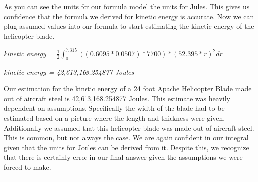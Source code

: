 \documentclass[a4paper, 11pt, oneside]{book} %
\begin{document}
As you can see the units for our formula model the units for Jules. This gives us confidence that the formula we derived for kinetic energy is accurate. Now we can plug assumed values into our formula to start estimating the kinetic energy of the helicopter blade.\\

\vspace{0.5\baselineskip} %
\vspace{0.5\baselineskip} %

\textit{kinetic energy = $\frac{1}{2} \int_{0}^{7.315}((0.6095 *0.0507) *7700) * (52.395 * r)^2 dr$}\\

\vspace{0.5\baselineskip} %
\vspace{0.5\baselineskip} %

\textit{kinetic energy = 42,613,168.254877 Joules}\\

\vspace{0.5\baselineskip} %
\vspace{0.5\baselineskip} %

Our estimation for the kinetic energy of a 24 foot Apache Helicopter Blade made out of aircraft steel is 42,613,168.254877 Joules. This estimate was heavily dependent on assumptions. Specifically the width of the blade had to be estimated based on a picture where the length and thickness were given. Additionally we assumed that this helicopter blade was made out of aircraft steel. This is common, but not always the case. We are again confident in our integral given that the units for Joules can be derived from it. Despite this, we recognize that there is certainly error in our final answer given the assumptions we were forced to make.\\

\vspace{0.5\baselineskip} %
\vspace{0.5\baselineskip} %
---------------------------------------------------------------------------------------------------------
\vspace{0.5\baselineskip} %
\vspace{0.5\baselineskip} %
\end{document}
